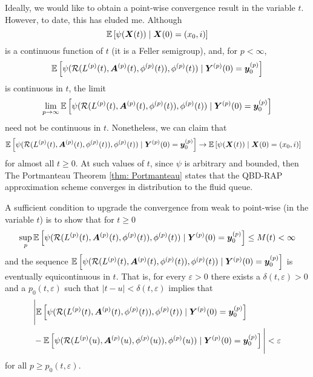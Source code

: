 Ideally, we would like to obtain a point-wise convergence result in the variable \(t\). However, to date, this has eluded me. Although 
\[\mathbb E\left[\psi({\boldsymbol X}(t))\mid \boldsymbol X(0)=(x_0,i) \right]\] 
is a continuous function of \(t\) (it is a Feller semigroup), and, for \(p<\infty\), 
\[\mathbb E\left[\psi( \mathcal R(L^{(p)}(t),\boldsymbol A^{(p)}(t),\phi^{(p)}(t)),\phi^{(p)}(t) )   \mid \boldsymbol Y^{(p)}(0)=\boldsymbol y_0^{(p)} \right]  \]
 is continuous in \(t\), the limit 
 \[\lim\limits_{p\to\infty}\mathbb E\left[\psi( \mathcal R(L^{(p)}(t),\boldsymbol A^{(p)}(t),\phi^{(p)}(t)),\phi^{(p)}(t) ) \mid \boldsymbol Y^{(p)}(0)=\boldsymbol y_0^{(p)}\right]  \] need not be continuous in \(t\). Nonetheless, we can claim that 
\begin{align}
		&\mathbb E\left[\psi( \mathcal R(L^{(p)}(t),\boldsymbol A^{(p)}(t),\phi^{(p)}(t)),\phi^{(p)}(t) )    \mid \boldsymbol Y^{(p)}(0)=\boldsymbol y_0^{(p)}\right]  \nonumber
		\to \mathbb E\left[\psi({\boldsymbol X}(t) )\mid \boldsymbol X(0)=(x_0, i) \right] \nonumber
\end{align}
for almost all \(t\geq 0\). At such values of \(t\), since \(\psi\) is arbitrary and bounded, then The Portmanteau Theorem \ref{thm: Portmanteau} states that the QBD-RAP approximation scheme converges in distribution to the fluid queue. 

A sufficient condition to upgrade the convergence from weak to point-wise (in the variable \(t\)) is to show that for \(t\geq 0\) 
\[\sup_{p}\mathbb E\left[\psi( \mathcal R(L^{(p)}(t),\boldsymbol A^{(p)}(t),\phi^{(p)}(t)),\phi^{(p)}(t) )  \mid \boldsymbol Y^{(p)}(0)=\boldsymbol y_0^{(p)} \right]  \leq M(t)<\infty\]
and the sequence \(\mathbb E\left[\psi( \mathcal R(L^{(p)}(t),\boldsymbol A^{(p)}(t),\phi^{(p)}(t)),\phi^{(p)}(t) )   \mid \boldsymbol Y^{(p)}(0)=\boldsymbol y_0^{(p)} \right]  \) is eventually equicontinuous in \(t\). That is, for every \(\varepsilon>0\) there exists a \(\delta(t,\varepsilon)>0\) and a \(p_0(t,\varepsilon)\) such that \(|t-u|<\delta(t,\varepsilon)\) implies that 
\begin{align}
	&\nonumber \Bigg|\mathbb E\left[\psi( \mathcal R(L^{(p)}(t),\boldsymbol A^{(p)}(t),\phi^{(p)}(t)),\phi^{(p)}(t) )   \mid \boldsymbol Y^{(p)}(0)=\boldsymbol y_0^{(p)} \right] 
	\\&{}-\mathbb E\left[\psi( \mathcal R(L^{(p)}(u),\boldsymbol A^{(p)}(u),\phi^{(p)}(u)),\phi^{(p)}(u) )   \mid \boldsymbol Y^{(p)}(0)=\boldsymbol y_0^{(p)}\right] \Bigg| \nonumber 
	<\varepsilon
\end{align}
for all \(p\geq p_0(t,\varepsilon)\). 

